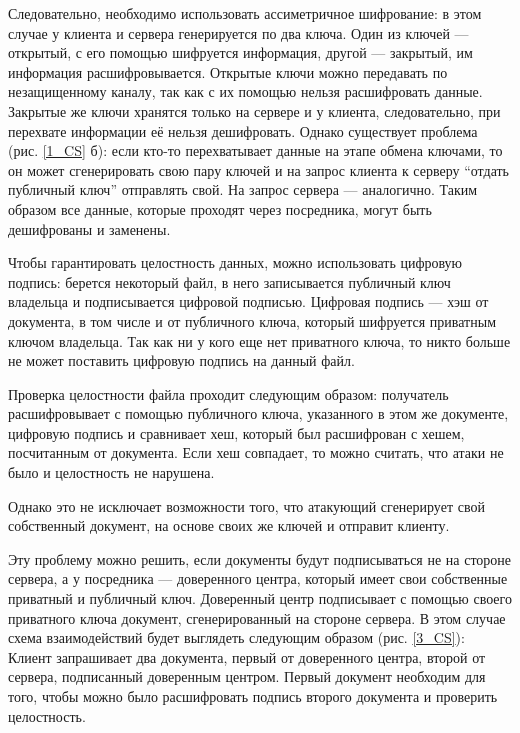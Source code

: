 Следовательно, необходимо использовать ассиметричное шифрование: в этом случае у клиента и сервера генерируется по два ключа. Один из ключей --- открытый, с его помощью шифруется информация, другой --- закрытый, им информация расшифровывается. Открытые ключи можно передавать по незащищенному каналу, так как с их помощью нельзя расшифровать данные. Закрытые же ключи хранятся только на сервере и у клиента, следовательно, при перехвате информации её нельзя дешифровать.
Однако существует проблема (рис. \ref{1_CS} б): если кто-то перехватывает данные на этапе обмена ключами, то он может сгенерировать свою пару ключей и на запрос клиента к серверу ``отдать публичный ключ'' отправлять свой. На запрос сервера --- аналогично. Таким образом все данные, которые проходят через посредника, могут быть дешифрованы и заменены.

Чтобы гарантировать целостность данных, можно использовать цифровую подпись: берется некоторый файл, в него записывается публичный ключ владельца и подписывается цифровой подписью. Цифровая подпись --- хэш от документа, в том числе и от публичного ключа, который шифруется приватным ключом владельца. Так как ни у кого еще нет приватного ключа, то никто больше не может поставить цифровую подпись на данный файл.

Проверка целостности файла проходит следующим образом: получатель расшифровывает с помощью публичного ключа, указанного в этом же документе, цифровую подпись и сравнивает хеш, который был расшифрован с хешем, посчитанным от документа. Если хеш совпадает, то можно считать, что атаки не было и целостность не нарушена.

Однако это не исключает возможности того, что атакующий сгенерирует свой собственный документ, на основе своих же ключей и отправит клиенту.

Эту проблему можно решить, если документы будут подписываться не на стороне сервера, а у посредника --- доверенного центра, который имеет свои собственные приватный и публичный ключ. Доверенный центр подписывает с помощью своего приватного ключа документ, сгенерированный на стороне сервера. В этом случае схема взаимодействий  будет выглядеть следующим образом (рис. \ref{3_CS}):
Клиент запрашивает два документа, первый от доверенного центра, второй от сервера, подписанный доверенным центром. Первый документ необходим для того, чтобы можно было расшифровать подпись второго документа и проверить целостность.

